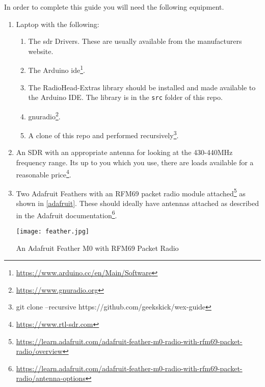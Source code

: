 In order to complete this guide you will need the following equipment.

\begin{enumerate}
\item Laptop with the following: 
\begin{enumerate}
\item The \gls{sdr} Drivers. These are usually available from the manufacturers website.
\item The Arduino  \gls{ide}\footnote{\url{https://www.arduino.cc/en/Main/Software}}.
\item The RadioHead-Extras library should be installed and made available to the Arduino IDE. The library is in the \verb|src| folder of this repo.
\item gnuradio\footnote{\url{https://www.gnuradio.org}}.
\item A clone of this repo and performed recursively\footnote{git clone --recursive https://github.com/geekskick/wex-guide}.
\end{enumerate}
\item An SDR with an appropriate antenna for looking at the 430-440MHz frequency range. Its up to you which you use, there are loads available for a reasonable price\footnote{\url{https://www.rtl-sdr.com}}.
\item Two Adafruit Feathers with an RFM69 packet radio module attached\footnote{\url{https://learn.adafruit.com/adafruit-feather-m0-radio-with-rfm69-packet-radio/overview}} as shown in \cref{adafruit}. These should ideally have antennas attached as described in the Adafruit documentation\footnote{\url{https://learn.adafruit.com/adafruit-feather-m0-radio-with-rfm69-packet-radio/antenna-options}}. 

\centrefigurestart
\texttt{[image: feather.jpg]}
\caption{An Adafruit Feather M0 with RFM69 Packet Radio}
\label{adafruit}
\centrefigureend

\end{enumerate}
